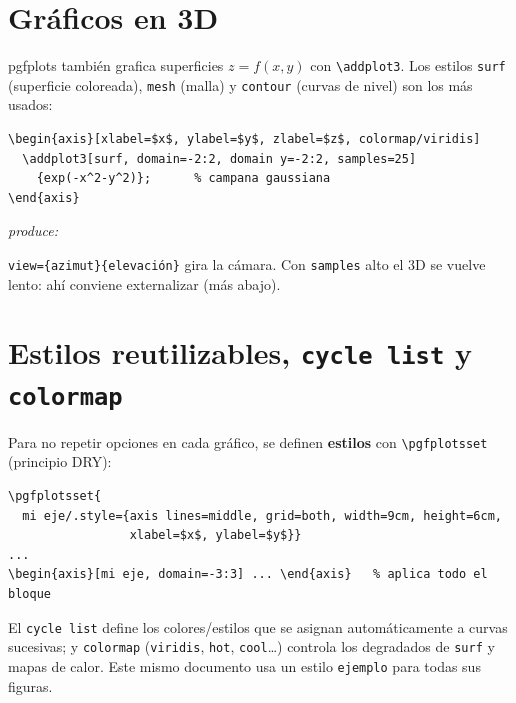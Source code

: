 \documentclass[11pt,a4paper]{article}
\newcommand{\C}[1]{\texttt{\textbackslash #1}}
\newcommand{\pkg}[1]{\textsf{#1}}
\newcommand{\produce}{\par\smallskip\noindent\textit{produce:}\par\smallskip}
\begin{document}
\section{Gráficos en 3D}
\pkg{pgfplots} también grafica superficies $z=f(x,y)$ con \C{addplot3}. Los estilos
\texttt{surf} (superficie coloreada), \texttt{mesh} (malla) y \texttt{contour}
(curvas de nivel) son los más usados:
\begin{lstlisting}
\begin{axis}[xlabel=$x$, ylabel=$y$, zlabel=$z$, colormap/viridis]
  \addplot3[surf, domain=-2:2, domain y=-2:2, samples=25]
    {exp(-x^2-y^2)};      % campana gaussiana
\end{axis}
\end{lstlisting}
\produce
\begin{center}
\end{center}
\texttt{view=\{azimut\}\{elevación\}} gira la cámara. Con \texttt{samples} alto el
3D se vuelve lento: ahí conviene externalizar (más abajo).

\section{Estilos reutilizables, \texttt{cycle list} y \texttt{colormap}}
Para no repetir opciones en cada gráfico, se definen \textbf{estilos} con
\C{pgfplotsset} (principio DRY):
\begin{lstlisting}
\pgfplotsset{
  mi eje/.style={axis lines=middle, grid=both, width=9cm, height=6cm,
                 xlabel=$x$, ylabel=$y$}}
...
\begin{axis}[mi eje, domain=-3:3] ... \end{axis}   % aplica todo el bloque
\end{lstlisting}
El \texttt{cycle list} define los colores/estilos que se asignan automáticamente a
curvas sucesivas; y \texttt{colormap} (\texttt{viridis}, \texttt{hot},
\texttt{cool}\dots) controla los degradados de \texttt{surf} y mapas de calor. Este
mismo documento usa un estilo \texttt{ejemplo} para todas sus figuras.
\end{document}
